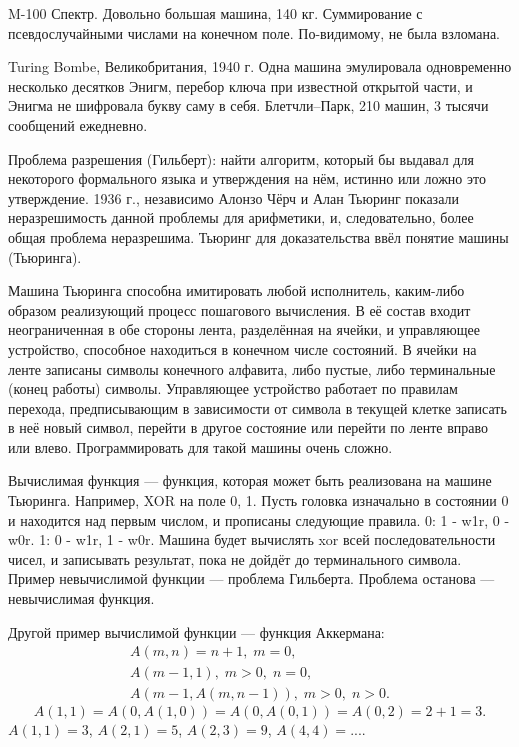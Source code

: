 \documentclass{book}
\begin{document}
M-100 Спектр. Довольно большая машина, 140 кг. Суммирование с псевдослучайными
числами на конечном поле. По-видимому, не была взломана.

Turing Bombe, Великобритания, 1940 г. Одна машина эмулировала одновременно
несколько десятков Энигм, перебор ключа при известной открытой части, и Энигма
не шифровала букву саму в себя. Блетчли--Парк, 210 машин, 3 тысячи сообщений
ежедневно.

Проблема разрешения (Гильберт): найти алгоритм, который бы выдавал для
некоторого формального языка и утверждения на нём, истинно или ложно это
утверждение. 1936 г., независимо Алонзо Чёрч и Алан Тьюринг показали
неразрешимость данной проблемы для арифметики, и, следовательно, более общая
проблема неразрешима. Тьюринг для доказательства ввёл понятие машины (Тьюринга). 

Машина Тьюринга способна имитировать любой исполнитель, каким-либо образом
реализующий процесс пошагового вычисления. В её состав входит неограниченная в
обе стороны лента, разделённая на ячейки, и управляющее устройство, способное
находиться в конечном числе состояний. В ячейки на ленте записаны символы
конечного алфавита, либо пустые, либо терминальные (конец работы) символы.
Управляющее устройство работает по правилам перехода, предписывающим в
зависимости от символа в текущей клетке записать в неё новый символ, перейти в
другое состояние или перейти по ленте вправо или влево. Программировать для
такой машины очень сложно.

Вычислимая функция --- функция, которая может быть реализована на машине
Тьюринга. Например, XOR на поле 0, 1. Пусть головка изначально в состоянии 0 и
находится над первым числом, и прописаны следующие правила. 0: 1 - w1r, 0 - w0r.
1: 0 - w1r, 1 - w0r. Машина будет вычислять xor всей последовательности чисел, и
записывать результат, пока не дойдёт до терминального символа. Пример
невычислимой функции --- проблема Гильберта. Проблема останова --- невычислимая функция.

Другой пример вычислимой функции
--- функция Аккермана:
\begin{eqnarray}
    A(m, n) = n + 1, \; m = 0,\\
    A(m - 1, 1), \; m > 0, \; n = 0,\\
    A(m - 1, A(m, n - 1)), \; m > 0, \; n > 0.
\end{eqnarray}
\begin{equation}
    A(1,1) = A(0, A(1,0)) = A(0, A(0,1)) = A(0, 2) = 2 + 1 = 3.
\end{equation}
$A(1,1) = 3$, $A(2,1) = 5$, $A(2,3) = 9$, $A(4,4) = ...$.
\end{document}
